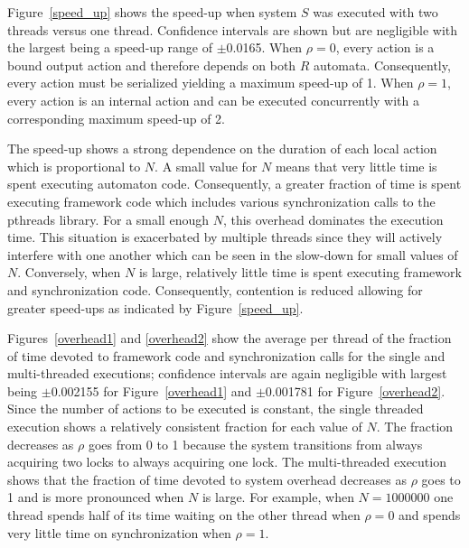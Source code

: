 Figure~\ref{speed_up} shows the speed-up when system $S$ was executed with two threads versus one thread.
Confidence intervals are shown but are negligible with the largest being a speed-up range of $\pm$0.0165.
When $\rho = 0$, every action is a bound output action and therefore depends on both $R$ automata.
Consequently, every action must be serialized yielding a maximum speed-up of 1.
When $\rho = 1$, every action is an internal action and can be executed concurrently with a corresponding maximum speed-up of 2.

The speed-up shows a strong dependence on the duration of each local action which is proportional to $N$.
A small value for $N$ means that very little time is spent executing automaton code.
Consequently, a greater fraction of time is spent executing framework code which includes various synchronization calls to the pthreads library.
For a small enough $N$, this overhead dominates the execution time.
This situation is exacerbated by multiple threads since they will actively interfere with one another which can be seen in the slow-down for small values of $N$.
Conversely, when $N$ is large, relatively little time is spent executing framework and synchronization code.
Consequently, contention is reduced allowing for greater speed-ups as indicated by Figure~\ref{speed_up}.

Figures~\ref{overhead1} and \ref{overhead2} show the average per thread of the fraction of time devoted to framework code and synchronization calls for the single and multi-threaded executions; confidence intervals are again negligible with largest being $\pm$0.002155 for Figure~\ref{overhead1} and $\pm$0.001781 for Figure~\ref{overhead2}.
Since the number of actions to be executed is constant, the single threaded execution shows a relatively consistent fraction for each value of $N$.
The fraction decreases as $\rho$ goes from 0 to 1 because the system transitions from always acquiring two locks to always acquiring one lock.
The multi-threaded execution shows that the fraction of time devoted to system overhead decreases as $\rho$ goes to 1 and is more pronounced when $N$ is large.
For example, when $N=1000000$ one thread spends half of its time waiting on the other thread when $\rho = 0$ and spends very little time on synchronization when $\rho = 1$.


